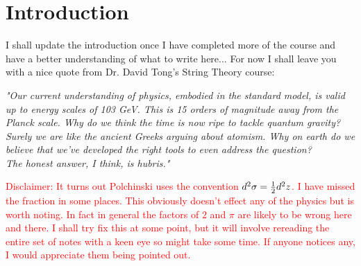 \chapter{Introduction}

I shall update the introduction once I have completed more of the course and have a better understanding of what to write here... For now I shall leave you with a nice quote from Dr. David Tong's String Theory course:

\begin{center}
    \textit{
        "Our current understanding of physics, embodied in the standard model, is valid up to energy scales of 103 GeV. This is 15 orders of magnitude away from the Planck scale. Why do we think the time is now ripe to tackle quantum gravity? Surely we are like the ancient Greeks arguing about atomism. Why on earth do we believe that we've developed the right tools to even address the question?\\
        The honest answer, I think, is hubris."
    }
\end{center}


\textcolor{red}{Disclaimer: It turns out Polchinski uses the convention $d^2\sigma = \frac{1}{2}d^2z$. I have missed the fraction in some places. This obviously doesn't effect any of the physics but is worth noting. In fact in general the factors of $2$ and $\pi$ are likely to be wrong here and there. I shall try fix this at some point, but it will involve rereading the entire set of notes with a keen eye so might take some time. If anyone notices any, I would appreciate them being pointed out.}

